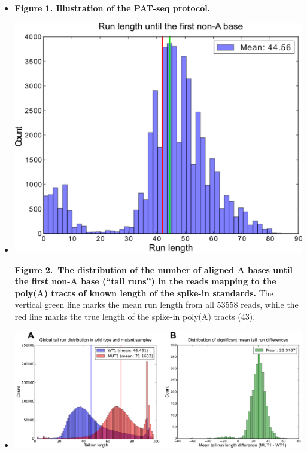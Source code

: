 \documentclass[10pt]{article}
\begin{document}
\begin{itemize}

\item[]{




\textbf{Figure 1. Illustration of the PAT-seq protocol.
}
}


\item[]{
\includegraphics[scale=0.8]{Figure2.png}

\textbf{Figure 2.~The distribution of the number of aligned A bases until the first non-A base (``tail runs'') in the reads mapping to the poly(A) tracts of known length of the spike-in standards.} The vertical green line marks the mean run length from all 53558 reads, while the red line marks the true length of the spike-in poly(A) tracts (43).}




\item[]{
\includegraphics[scale=0.8]{Figure3.png}




}
\end{itemize}
\end{document}
